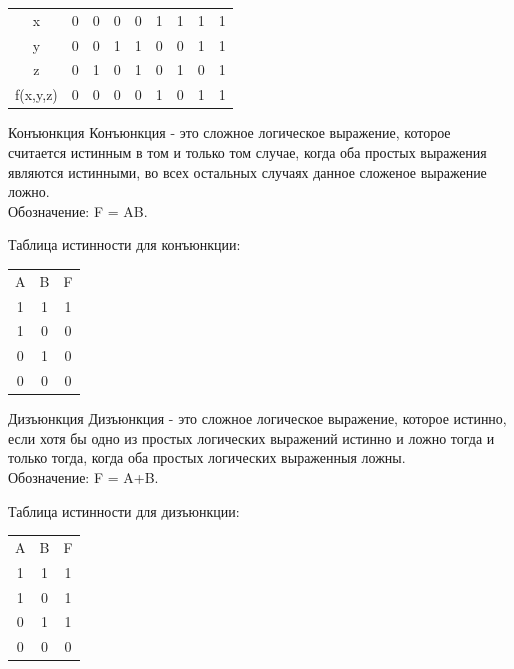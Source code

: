 \documentclass{beamer}
\begin{document}
\begin{table}[]
    \centering
    \begin{tabular}{|c|c|c|c|c|c|c|c|c|}
    \hline
x&0&0&0&0&1&1&1&1\\
y&0&0&1&1&0&0&1&1\\
z&0&1&0&1&0&1&0&1\\
f(x,y,z)&0&0&0&0&1&0&1&1\\
\hline
    \end{tabular}
    \label{tab:my_label}
\end{table}
\newpage
\begin{frame}{Конъюнкция}
Конъюнкция - это сложное логическое выражение, которое считается истинным в том и только том случае, когда оба простых выражения являются истинными, во всех остальных случаях данное сложеное выражение ложно.\\
Обозначение: F = AB.

Таблица истинности для конъюнкции:
\begin{table}[]
    \centering
    \begin{tabular}{|c|c|c|}
    \hline
A&B&F\\
1&1&1\\
1&0&0\\
0&1&0\\
0&0&0\\
\hline
    \end{tabular}
    \label{tab:my_label}
\end{table}
    \end{frame}
\begin{frame}{Дизъюнкция}
Дизъюнкция - это сложное логическое выражение, которое истинно, если хотя бы одно из простых логических выражений истинно и ложно тогда и только тогда, когда оба простых логических выраженныя ложны.\\
Обозначение: F = A+B.

Таблица истинности для дизъюнкции:
\begin{table}[]
    \centering
    \begin{tabular}{|c|c|c|}
    \hline
A&B&F\\
1&1&1\\
1&0&1\\
0&1&1\\
0&0&0\\
\hline
    \end{tabular}
    \label{tab:my_label}
\end{table}
    \end{frame}
\end{document}
